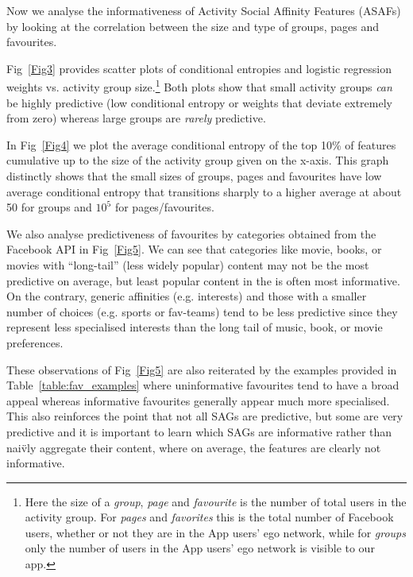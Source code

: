 


Now we analyse the informativeness of Activity Social Affinity
Features (ASAFs) by looking at the correlation between the size and
type of groups, pages and favourites.

Fig~\ref{Fig3} provides scatter plots of conditional
entropies and logistic regression weights vs. activity group 
size.\footnote{Here the size of a {\em group}, {\em page} and {\em favourite}
is the number of total users in the activity group.  For {\em pages}
and {\em favorites} this is the total number of Facebook users,
whether or not they are in the App users' ego network, while for {\em
groups} only the number of users in the App users' ego network is
visible to our app.}  Both plots show that small activity groups
\emph{can} be highly predictive (low conditional entropy or
weights that deviate extremely from zero) whereas large groups are
\emph{rarely} predictive.

In Fig~\ref{Fig4} we plot the average conditional entropy of the top
10\% of features cumulative up to the size of the activity group given
on the x-axis.
This graph distinctly shows that the
small sizes of groups, pages and favourites have low average
conditional entropy that transitions sharply to a higher average 
at about 50 for groups and $10^{5}$ for pages/favourites.


We also analyse predictiveness of favourites by categories obtained
from the Facebook API in Fig~\ref{Fig5}.
We can see that categories like movie, books, or movies with
``long-tail'' (less widely popular) content may not be
the most predictive on average, but %
least popular content in the 
is often most informative.  On the contrary, generic affinities
(e.g. interests) and those with a smaller number of choices
(e.g. sports or fav-teams) tend to be less predictive since they
represent less specialised interests than the long tail of music,
book, or movie preferences.

These observations of Fig~\ref{Fig5} are also reiterated by the
examples provided in Table~\ref{table:fav_examples} where
uninformative favourites tend to have a broad appeal whereas
informative favourites generally appear much more specialised.  This
also reinforces the point that not all SAGs are predictive, but some
are very predictive and it is important to learn which SAGs are
informative rather than nai\"{v}ly aggregate their content, where on
average, the features are clearly not informative.
   
